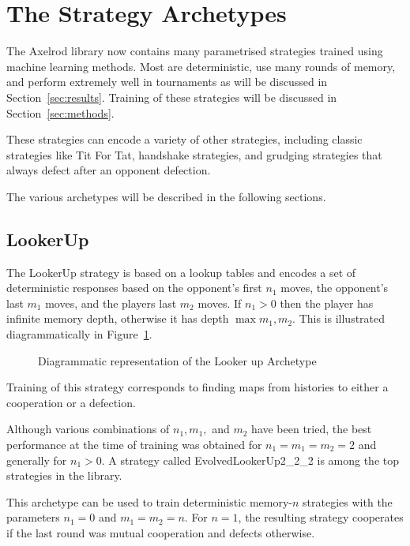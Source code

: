 \documentclass{article}
\begin{document}
\section{The Strategy Archetypes}

The Axelrod library now contains many parametrised strategies trained using
machine learning
methods. Most are deterministic, use many rounds of memory, and perform
extremely well in tournaments as will be discussed in Section~\ref{sec:results}.
Training of these strategies will be discussed in Section~\ref{sec:methods}.

These strategies can encode a variety
of other strategies, including classic strategies like Tit For Tat,
handshake strategies, and grudging strategies that always defect after
an opponent defection.

The various archetypes will be described in the following sections.

\subsection{LookerUp}\label{sec:lookerup}

The LookerUp strategy is based on a lookup tables and  encodes a set of
deterministic responses based on the opponent's first $n_1$ moves, the
opponent's last $m_1$ moves, and the players last $m_2$ moves. If $n_1 > 0$ then
the player has infinite memory depth, otherwise it has depth $\max{m_1, m_2}$.
This is illustrated diagrammatically in Figure~\ref{fig:lookerup}.

\begin{figure}[!hbtp]
    \centering
    
    \caption{Diagrammatic representation of the Looker up Archetype}
    \label{fig:lookerup}
\end{figure}

Training of this strategy corresponds to finding maps from histories to either a
cooperation or a defection.

Although various
combinations of $n_1, m_1,$ and $m_2$ have been tried, the best performance at
the time of
training was obtained for $n_1 = m_1 = m_2 = 2$ and generally for $n_1 > 0$.
A strategy
called EvolvedLookerUp2\_2\_2 is among the top strategies in the library.

This archetype can be used to train deterministic memory-$n$ strategies with the
parameters $n_1=0$ and $m_1=m_2=n$. For $n=1$, the resulting strategy cooperates
if the last round was mutual cooperation and defects otherwise.
\end{document}
